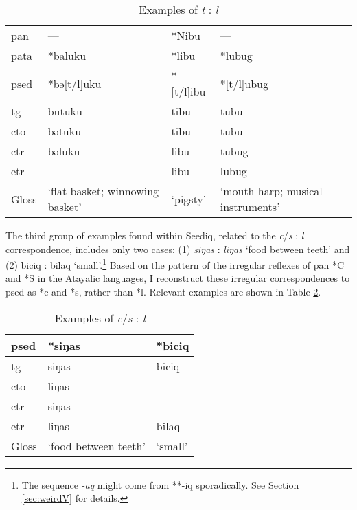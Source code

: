\begin{table}[!htbp]
\centering
\caption{Examples of \textit{t} : \textit{l}}
\label{tab:irr_tl}
\begin{tabular}{llll}
\hline
\acs{pan}  & ---                             & *Nibu    & ---                               \\
\acs{pata} & *baluku                         & *libu    & *lubug                            \\ \hline
\ac{psed}  & *bə[t/l]uku                     & *[t/l]ibu & *[t/l]ubug                        \\ \hdashline
\ac{tg}    & butuku                          & tibu      & tubu                              \\
\ac{cto}   & bətuku                          & tibu      & tubu                              \\
\ac{ctr}   & bəluku                          & libu      & tubug                             \\
\ac{etr}   &                                 & libu      & lubug                             \\ \hline
Gloss      & `flat basket; winnowing basket' & `pigsty'  & `mouth harp; musical instruments' \\ \hline
\end{tabular}
\end{table}

The third group of examples found within Seediq, related to the \textit{c}/\textit{s} : \textit{l} correspondence, includes only two cases: (1) \textit{siŋas} : \textit{liŋas} `food between teeth' and (2) biciq : bilaq `small'.\footnote{The sequence \textit{-aq} might come from **-iq sporadically. See Section \ref{sec:weirdV} for details.} Based on the pattern of the irregular reflexes of \acl{pan} *C and *S in the Atayalic languages, I reconstruct these irregular correspondences to \acl{psed} as *c and *s, rather than *l. Relevant examples are shown in Table \ref{tab:irr_cls}.

\begin{table}[!htbp]
\centering
\caption{Examples of \textit{c}/\textit{s} : \textit{l}}
\label{tab:irr_cls}
\begin{tabular}{lll}
\hline
\acs{psed} & *siŋas               & *biciq  \\ \hline
\acs{tg}   & siŋas                & biciq   \\ 
\acs{cto}  & liŋas                &         \\
\acs{ctr}  & siŋas                &         \\
\acs{etr}  & liŋas                & bilaq   \\ \hline
Gloss      & `food between teeth' & `small' \\ \hline
\end{tabular}
\end{table}

